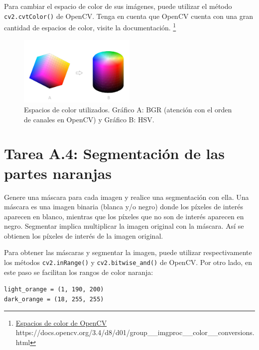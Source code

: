Para cambiar el espacio de color de sus imágenes, puede utilizar el método \texttt{cv2.cvtColor()} de OpenCV. Tenga en cuenta que OpenCV cuenta con una gran cantidad de espacios de color, visite la documentación. \footnote{ \href{https://docs.opencv.org/3.4/d8/d01/group\_\_imgproc\_\_color\_\_conversions.html}{Espacios de color de OpenCV} https://docs.opencv.org/3.4/d8/d01/group\_\_imgproc\_\_color\_\_conversions.html}



\begin{figure}[h]
    \centering
    \includegraphics[width=0.5\textwidth]{Lab_2/template/figures/color_spaces.png}
    \caption{Espacios de color utilizados. Gráfico A: BGR (atención con el orden de canales en OpenCV) y Gráfico B: HSV.}
    
    \label{fig:color_spaces}
\end{figure}

\section*{Tarea A.4: Segmentación de las partes naranjas}

Genere una máscara para cada imagen y realice una segmentación con ella. Una máscara es una imagen binaria (blanca y/o negro) donde los píxeles de interés aparecen en blanco, mientras que los píxeles que no son de interés aparecen en negro. Segmentar implica multiplicar la imagen original con la máscara. Así se obtienen los píxeles de interés de la imagen original.

Para obtener las máscaras y segmentar la imagen, puede utilizar respectivamente los métodos \texttt{cv2.inRange()} y \texttt{cv2.bitwise\_and()} de OpenCV. Por otro lado, en este paso se facilitan los rangos de color naranja:

\begin{tcolorbox}[colback=gray!85, coltext=white, colframe=white, fonttitle=\bfseries, title=Important Note, boxrule=0.5mm]
\texttt{light\_orange = (1, 190, 200)}\\
\texttt{dark\_orange = (18, 255, 255)}
\end{tcolorbox}


